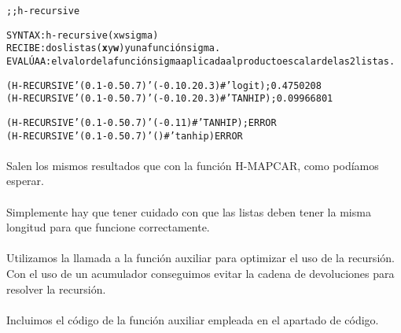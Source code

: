 \begin{aibox}{\function}
\begin{alltt}
;; h-recursive

SYNTAX: h-recursive (x w sigma) 
RECIBE: dos listas (\textbf{x} y \textbf{w}) y una función sigma.
EVALÚA A: el valor de la función sigma aplicada al producto escalar de las 2 listas.
\end{alltt}
\end{aibox}

\begin{aibox}{\examples}
\begin{alltt}
(H-RECURSIVE '(0.1 -0.5 0.7) '(-0.1 0.2 0.3) #'logit); 0.4750208
(H-RECURSIVE '(0.1 -0.5 0.7) '(-0.1 0.2 0.3) #'TANHIP); 0.09966801

(H-RECURSIVE '(0.1 -0.5 0.7) '(-0.1 1) #'TANHIP); ERROR
(H-RECURSIVE '(0.1 -0.5 0.7) '() #'tanhip) ERROR
\end{alltt}
\end{aibox}

\begin{aibox}{\comments}
\paragraph{}
Salen los mismos resultados que con la función H-MAPCAR, como podíamos esperar. \paragraph{}
Simplemente hay que tener cuidado con que las listas deben tener la misma longitud para que funcione correctamente.\paragraph{}
Utilizamos la llamada a la función auxiliar para optimizar el uso de la recursión. Con el uso de un acumulador conseguimos evitar la cadena de devoluciones para resolver la recursión.\paragraph{}
Incluimos el código de la función auxiliar empleada en el apartado de código.
\end{aibox}

